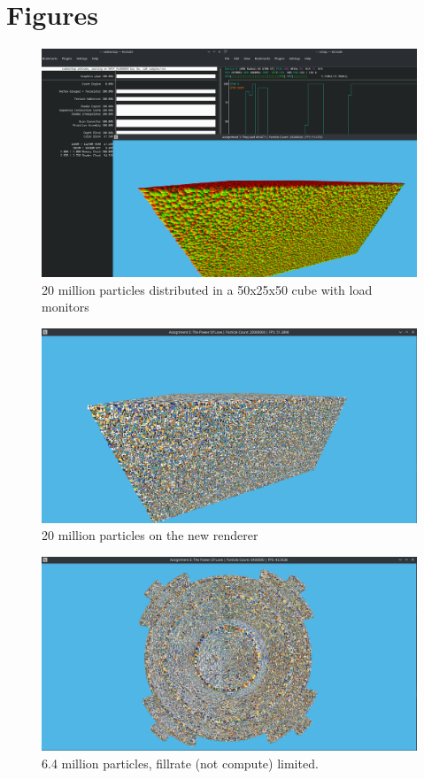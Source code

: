 \documentclass[]{report}
\begin{document}
\section{Figures}
\begin{figure}[H]
	\centerline{\includegraphics[width=1.6\linewidth]{screenshot002}}
	\caption[]{20 million particles distributed in a 50x25x50 cube with load monitors}
	\label{fig:screenshot002}
\end{figure}

\begin{figure}[H]
	\centerline{\includegraphics[width=1.6\linewidth]{screenshot003}}
	\caption{20 million particles on the new renderer}
	\label{fig:newrender}
\end{figure}

\begin{figure}
	\centering
	\centerline{\includegraphics[width=1.6\linewidth]{screenshot004}}
	\caption{6.4 million particles, fillrate (not compute) limited.}
	\label{fig:phyiscsrend}
\end{figure}
\end{document}
